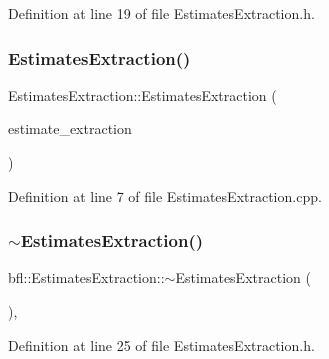 Definition at line 19 of file Estimates\+Extraction.\+h.

\mbox{\label{classbfl_1_1EstimatesExtraction_a3d16bdd9dbc8841eae07cfdc3aa52114}} 
\subsubsection{\texorpdfstring{Estimates\+Extraction()}{EstimatesExtraction()}\hspace{0.1cm}{\footnotesize\ttfamily [2/2]}}
{\footnotesize\ttfamily Estimates\+Extraction\+::\+Estimates\+Extraction (\begin{DoxyParamCaption}\item[{\mbox{\hyperlink{classbfl_1_1EstimatesExtraction}{Estimates\+Extraction}} \&\&}]{estimate\+\_\+extraction }\end{DoxyParamCaption})\hspace{0.3cm}{\ttfamily [noexcept]}}



Definition at line 7 of file Estimates\+Extraction.\+cpp.

\mbox{\label{classbfl_1_1EstimatesExtraction_af7a89d920cc8e4ebbef66c1dfce37ecb}} 
\subsubsection{\texorpdfstring{$\sim$\+Estimates\+Extraction()}{~EstimatesExtraction()}}
{\footnotesize\ttfamily bfl\+::\+Estimates\+Extraction\+::$\sim$\+Estimates\+Extraction (\begin{DoxyParamCaption}{ }\end{DoxyParamCaption})\hspace{0.3cm}{\ttfamily [inline]}, {\ttfamily [noexcept]}}



Definition at line 25 of file Estimates\+Extraction.\+h.



